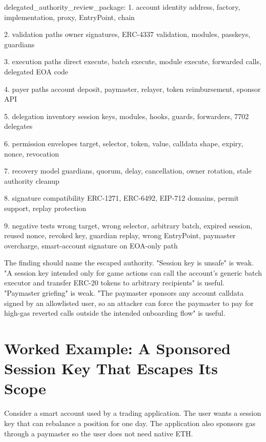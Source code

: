 \begin{codeblock}
delegated_authority_review_package:
    1. account identity
       address, factory, implementation, proxy, EntryPoint, chain

    2. validation paths
       owner signatures, ERC-4337 validation, modules, passkeys, guardians

    3. execution paths
       direct execute, batch execute, module execute, forwarded calls, delegated EOA code

    4. payer paths
       account deposit, paymaster, relayer, token reimbursement, sponsor API

    5. delegation inventory
       session keys, modules, hooks, guards, forwarders, 7702 delegates

    6. permission envelopes
       target, selector, token, value, calldata shape, expiry, nonce, revocation

    7. recovery model
       guardians, quorum, delay, cancellation, owner rotation, stale authority cleanup

    8. signature compatibility
       ERC-1271, ERC-6492, EIP-712 domains, permit support, replay protection

    9. negative tests
       wrong target, wrong selector, arbitrary batch, expired session,
       reused nonce, revoked key, guardian replay, wrong EntryPoint,
       paymaster overcharge, smart-account signature on EOA-only path
\end{codeblock}

The finding should name the escaped authority. "Session key is unsafe" is weak. "A session key intended only for game actions can call the account's generic batch executor and transfer ERC-20 tokens to arbitrary recipients" is useful. "Paymaster griefing" is weak. "The paymaster sponsors any account calldata signed by an allowlisted user, so an attacker can force the paymaster to pay for high-gas reverted calls outside the intended onboarding flow" is useful.

\section{Worked Example: A Sponsored Session Key That Escapes Its Scope}

Consider a smart account used by a trading application. The user wants a session key that can rebalance a position for one day. The application also sponsors gas through a paymaster so the user does not need native ETH.

